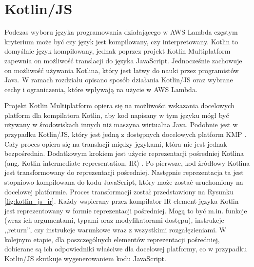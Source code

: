 \section{Kotlin/JS}\label{chapter:kotlin_js}

Podczas wyboru języka programowania działającego w AWS Lambda częstym kryterium może być czy język jest kompilowany, czy interpretowany.
Kotlin to domyślnie język kompilowany, jednak poprzez projekt Kotlin Multiplatform zapewnia on możliwość translacji do języka JavaScript.
Jednocześnie zachowuje on możliwość używania Kotlina, który jest łatwy do nauki przez programistów Java.
W ramach rozdziału opisano sposób działania Kotlin/JS oraz wybrane cechy i ograniczenia, które wpływają na użycie w AWS Lambda.

Projekt Kotlin Multiplatform opiera się na możliwości wskazania docelowych platform dla kompilatora Kotlin, aby kod napisany w tym języku mógł być używany w środowiskach innych niż maszyna wirtualna Java.
Podobnie jest w przypadku Kotlin/JS, który jest jedną z dostępnych docelowych platform KMP \cite{kotlinlangKotlinDocs}.
Cały proces opiera się na translacji między językami, która nie jest jednak bezpośrednia.
Dodatkowym krokiem jest użycie reprezentacji pośredniej Kotlina (ang. Kotlin intermediate representation, IR) \cite{kotlinlangKotlinDocs}.
Po pierwsze, kod źródłowy Kotlina jest transformowany do reprezentacji pośredniej.
Następnie reprezentacja ta jest stopniowo kompilowana do kodu JavaScript, który może zostać uruchomiony na docelowej platformie.
Proces transformacji został przedstawiony na Rysunku \ref{fig:kotlin_js_ir}. 
Każdy wspierany przez kompilator IR element języka Kotlin jest reprezentowany w formie reprezentacji pośredniej.
Mogą to być m.in. funkcje (wraz ich argumentami, typami oraz modyfikatorami dostępu), instrukcje ,,return'', czy instrukcje warunkowe wraz z wszystkimi rozgałęzieniami. 
W kolejnym etapie, dla poszczególnych elementów reprezentacji pośredniej, dobierane są ich odpowiedniki właściwe dla docelowej platformy, co w przypadku Kotlin/JS skutkuje wygenerowaniem kodu JavaScript.

